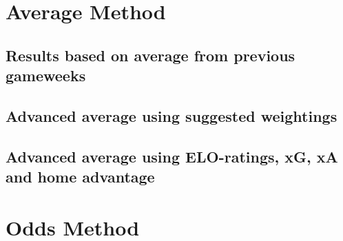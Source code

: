 \section{Average Method}
\subsection{Results based on average from previous gameweeks}
\subsection{Advanced average using suggested weightings}
\subsection{Advanced average using ELO-ratings, xG, xA and home advantage}
\section{Odds Method}


